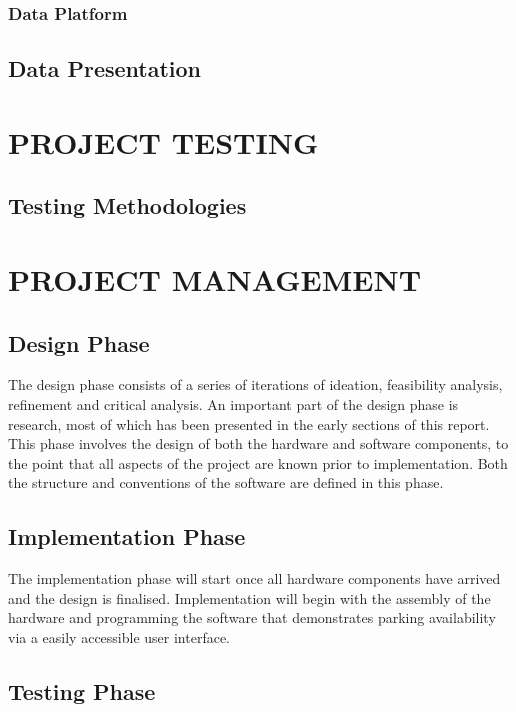 \documentclass[10pt,twocolumn]{witseiepaper}
\begin{document}
	\subsubsection{Data Platform}

	\subsection{Data Presentation}
	
\section{PROJECT TESTING}
	\subsection{Testing Methodologies}


\section{PROJECT MANAGEMENT}
	\subsection{Design Phase}
		The design phase consists of a series of iterations of ideation, feasibility analysis, refinement and critical analysis. An important part of the design phase is research, most of which has been presented in the early sections of this report. %
		This phase involves the design of both the hardware and software components, to the point that all aspects of the project are known prior to implementation. Both the structure and conventions of the software are defined in this phase.
	
	\subsection{Implementation Phase}
		The implementation phase will start once all hardware components have arrived and the design is finalised. Implementation will begin with the assembly of the hardware and programming the software that demonstrates parking availability via a easily accessible user interface.
	
	\subsection{Testing Phase}
		
\end{document}
